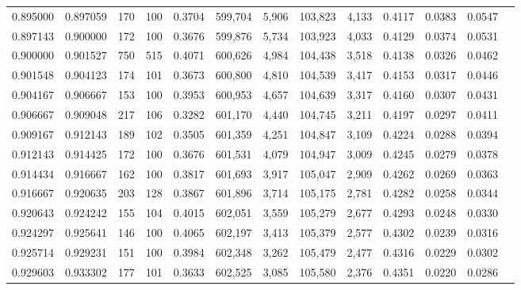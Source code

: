 \begin{tabular}{rrrrrrrrrrrrr}
0.895000 & 0.897059 &    170 &   100 &                                     0.3704 & 599,704 &   5,906 & 103,823 &   4,133 & 0.4117 & 0.0383 & 0.0547 \\
0.897143 & 0.900000 &    172 &   100 &                                     0.3676 & 599,876 &   5,734 & 103,923 &   4,033 & 0.4129 & 0.0374 & 0.0531 \\
0.900000 & 0.901527 &    750 &   515 &                                     0.4071 & 600,626 &   4,984 & 104,438 &   3,518 & 0.4138 & 0.0326 & 0.0462 \\
0.901548 & 0.904123 &    174 &   101 &                                     0.3673 & 600,800 &   4,810 & 104,539 &   3,417 & 0.4153 & 0.0317 & 0.0446 \\
0.904167 & 0.906667 &    153 &   100 &                                     0.3953 & 600,953 &   4,657 & 104,639 &   3,317 & 0.4160 & 0.0307 & 0.0431 \\
0.906667 & 0.909048 &    217 &   106 &                                     0.3282 & 601,170 &   4,440 & 104,745 &   3,211 & 0.4197 & 0.0297 & 0.0411 \\
0.909167 & 0.912143 &    189 &   102 &                                     0.3505 & 601,359 &   4,251 & 104,847 &   3,109 & 0.4224 & 0.0288 & 0.0394 \\
0.912143 & 0.914425 &    172 &   100 &                                     0.3676 & 601,531 &   4,079 & 104,947 &   3,009 & 0.4245 & 0.0279 & 0.0378 \\
0.914434 & 0.916667 &    162 &   100 &                                     0.3817 & 601,693 &   3,917 & 105,047 &   2,909 & 0.4262 & 0.0269 & 0.0363 \\
0.916667 & 0.920635 &    203 &   128 &                                     0.3867 & 601,896 &   3,714 & 105,175 &   2,781 & 0.4282 & 0.0258 & 0.0344 \\
0.920643 & 0.924242 &    155 &   104 &                                     0.4015 & 602,051 &   3,559 & 105,279 &   2,677 & 0.4293 & 0.0248 & 0.0330 \\
0.924297 & 0.925641 &    146 &   100 &                                     0.4065 & 602,197 &   3,413 & 105,379 &   2,577 & 0.4302 & 0.0239 & 0.0316 \\
0.925714 & 0.929231 &    151 &   100 &                                     0.3984 & 602,348 &   3,262 & 105,479 &   2,477 & 0.4316 & 0.0229 & 0.0302 \\
0.929603 & 0.933302 &    177 &   101 &                                     0.3633 & 602,525 &   3,085 & 105,580 &   2,376 & 0.4351 & 0.0220 & 0.0286 \\

\end{tabular}
